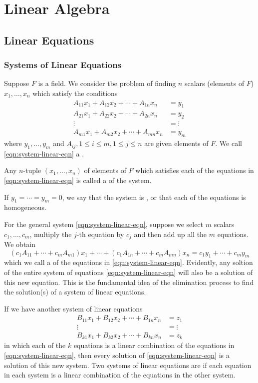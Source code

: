 \part{Linear Algebra}
\chapter{Linear Equations}
\section{Systems of Linear Equations}
Suppose $F$ is a field. We consider tbe problem of finding $n$ scalars (elements of $F$) $x_1,\dots,x_n$ which satisfy the conditions
\begin{equation}\label{eqn:system-linear-eqn}
\begin{split}
A_{11}x_1+A_{12}x_2+\cdots+A_{1n}x_n&=y_1\\
A_{21}x_1+A_{22}x_2+\cdots+A_{2n}x_n&=y_2\\
\vdots&=\vdots\\
A_{m1}x_1+A_{m2}x_2+\cdots+A_{mn}x_n&=y_m
\end{split}
\end{equation}
where $y_1,\dots,y_m$ and $A_{ij},1\le i\le m,1\le j\le n$ are given elements of $F$. We call \ref{eqn:system-linear-eqn} a .

Any $n$-tuple $(x_1,\dots,x_n)$ of elements of $F$ which satisfies each of the equations in \ref{eqn:system-linear-eqn} is called a  of the system.

If $y_1=\cdots=y_m=0$, we say that the system is , or that each of the equations is homogeneous.

For the general system \ref{eqn:system-linear-eqn}, suppose we select $m$ scalars $c_1,\dots,c_m$, multiply the $j$-th equation by $c_j$ and then add up all the $m$ equations. We obtain
\[(c_1A_{11}+\cdots+c_mA_{m1})x_1+\cdots+(c_1A_{1n}+\cdots+c_mA_{mn})x_n=c_1y_1+\cdots+c_my_m\]
which we call a  of the equations in \ref{eqn:system-linear-eqn}. Evidently, any soltion of the entire system of equations \ref{eqn:system-linear-eqn} will also be a solution of this new equation. This is the fundamental idea of the elimination process to find the solution(s) of a system of linear equations.

If we have another system of linear equations
\begin{equation}\label{eqn:system-linear-eqn2}
\begin{split}
B_{11}x_1+B_{12}x_2+\cdots+B_{1n}x_n&=z_1\\
\vdots&=\vdots\\
B_{k1}x_1+B_{k2}x_2+\cdots+B_{kn}x_n&=z_k
\end{split}
\end{equation}
in which each of the $k$ equations is a linear combination of the equations in \ref{eqn:system-linear-eqn}, then every solution of \ref{eqn:system-linear-eqn} is a solution of this new system. Two systems of linear equations are  if each equation in each system is a linear combination of the equations in the other system.


